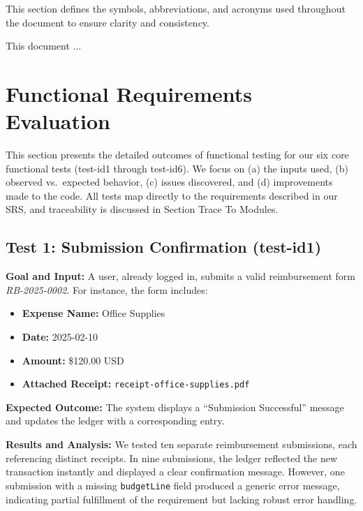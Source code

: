 \documentclass[12pt, titlepage]{article}
\begin{document}
\bigskip

This section defines the symbols, abbreviations, and acronyms used throughout the document to ensure clarity and consistency.

\newpage

\tableofcontents

\listoftables %

\listoffigures %

\newpage


This document ...

\section{Functional Requirements Evaluation}
\label{sec:FunctionalReqEval}

This section presents the detailed outcomes of functional testing for our six core functional tests (test-id1 through test-id6). We focus on (a) the inputs used, (b) observed vs.\ expected behavior, (c) issues discovered, and (d) improvements made to the code. All tests map directly to the requirements described in our SRS, and traceability is discussed in Section Trace To Modules.

\subsection{Test 1: Submission Confirmation (test-id1)}

\noindent
\textbf{Goal and Input:}  
A user, already logged in, submits a valid reimbursement form \emph{RB-2025-0002}. For instance, the form includes:
\begin{itemize}
  \item \textbf{Expense Name:} Office Supplies
  \item \textbf{Date:} 2025-02-10
  \item \textbf{Amount:} \$120.00 USD
  \item \textbf{Attached Receipt:} \texttt{receipt-office-supplies.pdf}
\end{itemize}
\textbf{Expected Outcome:} The system displays a “Submission Successful” message and updates the ledger with a corresponding entry.

\noindent
\textbf{Results and Analysis:}  
We tested ten separate reimbursement submissions, each referencing distinct receipts. In nine submissions, the ledger reflected the new transaction instantly and displayed a clear confirmation message. However, one submission with a missing \texttt{budgetLine} field produced a generic error message, indicating partial fulfillment of the requirement but lacking robust error handling.
\end{document}
